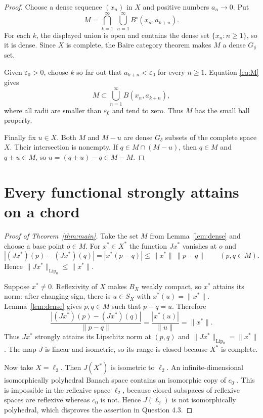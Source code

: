 \documentclass[11pt]{article}
\newcommand{\Lip}{\operatorname{Lip}_0}
\begin{document}
\begin{proof}
Choose a dense sequence $(x_n)$ in $X$ and positive numbers $a_n\to0$.  Put
\begin{equation}\label{eq:M}
 M=\bigcap_{k=1}^\infty\ \bigcup_{n=1}^\infty
 B^\circ(x_n,a_{k+n}).
\end{equation}
For each $k$, the displayed union is open and contains the dense set
$\{x_n:n\ge1\}$, so it is dense.  Since $X$ is complete, the Baire category
theorem makes $M$ a dense $G_\delta$ set.

Given $\varepsilon_0>0$, choose $k$ so far out that
$a_{k+n}<\varepsilon_0$ for every $n\ge1$.  Equation \eqref{eq:M} gives
\[
 M\subset \bigcup_{n=1}^\infty B(x_n,a_{k+n}),
\]
where all radii are smaller than $\varepsilon_0$ and tend to zero.  Thus $M$
has the small ball property.

Finally fix $u\in X$.  Both $M$ and $M-u$ are dense $G_\delta$ subsets of
the complete space $X$.  Their intersection is nonempty.  If
$q\in M\cap(M-u)$, then $q\in M$ and $q+u\in M$, so
$u=(q+u)-q\in M-M$.
\end{proof}

\section{Every functional strongly attains on a chord}

\begin{proof}[Proof of Theorem~\ref{thm:main}]
Take the set $M$ from Lemma~\ref{lem:dense} and choose a base point $o\in M$.
For $x^*\in X^*$ the function $Jx^*$ vanishes at $o$ and
\[
 |(Jx^*)(p)-(Jx^*)(q)|=|x^*(p-q)|
 \le \|x^*\|\,\|p-q\| \qquad(p,q\in M).
\]
Hence $\|Jx^*\|_{\Lip}\le\|x^*\|$.

Suppose $x^*\ne0$.  Reflexivity of $X$ makes $B_X$ weakly compact, so $x^*$
attains its norm: after changing sign, there is $u\in S_X$ with
$x^*(u)=\|x^*\|$.  Lemma~\ref{lem:dense} gives $p,q\in M$ such that
$p-q=u$.  Therefore
\[
 \frac{|(Jx^*)(p)-(Jx^*)(q)|}{\|p-q\|}
 =\frac{|x^*(u)|}{\|u\|}=\|x^*\|.
\]
Thus $Jx^*$ strongly attains its Lipschitz norm at $(p,q)$ and
$\|Jx^*\|_{\Lip}=\|x^*\|$.  The map $J$ is linear and isometric, so its
range is closed because $X^*$ is complete.

Now take $X=\ell_2$.  Then $J(X^*)$ is isometric to $\ell_2$.  An
infinite-dimensional isomorphically polyhedral Banach space contains an
isomorphic copy of $c_0$ \cite{fonf}.  This is impossible in the reflexive
space $\ell_2$, because closed subspaces of reflexive spaces are reflexive
whereas $c_0$ is not.  Hence $J(\ell_2)$ is not isomorphically polyhedral,
which disproves the assertion in Question 4.3.
\end{proof}
\end{document}
